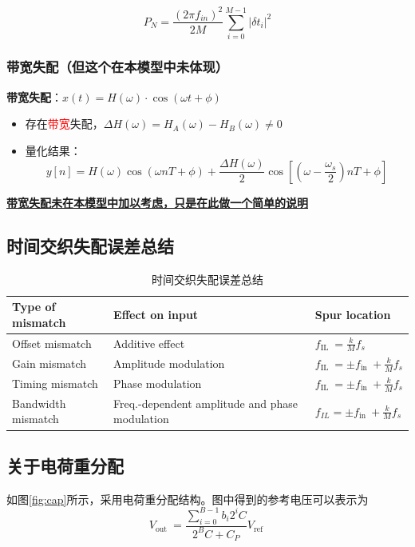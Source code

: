 \documentclass[cs4size,a4paper]{ctexart}
\numberwithin{equation}{section}
\numberwithin{table}{section}
\numberwithin{figure}{section}
\begin{document}
		\begin{equation}
			P_N=\frac{\left(2 \pi f_{i n}\right)^2}{2 M} \sum_{i=0}^{M-1}\left|\delta t_i\right|^2
		\end{equation}
		
		
		\subsubsection{带宽失配（但这个在本模型中未体现）}
		\textbf{带宽失配}：$x(t) = H(\omega) \cdot \cos(\omega t + \phi)$
		\begin{itemize}
			\item 存在\textcolor{red}{带宽}失配，$\Delta H(\omega) = H_A(\omega) - H_B(\omega) \neq 0$
			\item 量化结果：
			\[
			y[n] = H(\omega) \cos(\omega nT + \phi) + \frac{\Delta H(\omega)}{2} \cos\left[\left( \omega - \frac{\omega_s}{2} \right) nT + \phi \right]
			\]
		\end{itemize}
		\underline{\textbf{带宽失配未在本模型中加以考虑，只是在此做一个简单的说明}}
		
		\subsection{时间交织失配误差总结}
		\begin{flushleft}
			\begin{table}[H]
					\caption{时间交织失配误差总结}
					\begin{tabular}{|l|l|l|}
					\hline \textbf{Type of mismatch} & \textbf{Effect on input} & \textbf{Spur location} \\
					\hline Offset mismatch & Additive effect & $f_{\text {IL }}=\frac{k}{M} f_s$ \\
					\hline Gain mismatch & Amplitude modulation & $f_{\text {IL }}= \pm f_{\text {in }}+\frac{k}{M} f_s$ \\
					\hline Timing mismatch & Phase modulation & $f_{\text {IL }}= \pm f_{\text {in }}+\frac{k}{M} f_s$ \\
					\hline Bandwidth mismatch & Freq.-dependent amplitude and phase modulation & $f_{I L}= \pm f_{\text {in }}+\frac{k}{M} f_s$ \\
					\hline
				\end{tabular}
			\end{table}
		\end{flushleft}
		
		\subsection{关于电荷重分配}
			如图\ref{fig:cap}所示，采用电荷重分配结构。图中得到的参考电压可以表示为
			\begin{equation}
				V_{\text {out }}=\frac{\sum_{i=0}^{B-1} b_i 2^i C}{2^B C+C_P} V_{\text {ref }}
			\end{equation}
			
\end{document}
